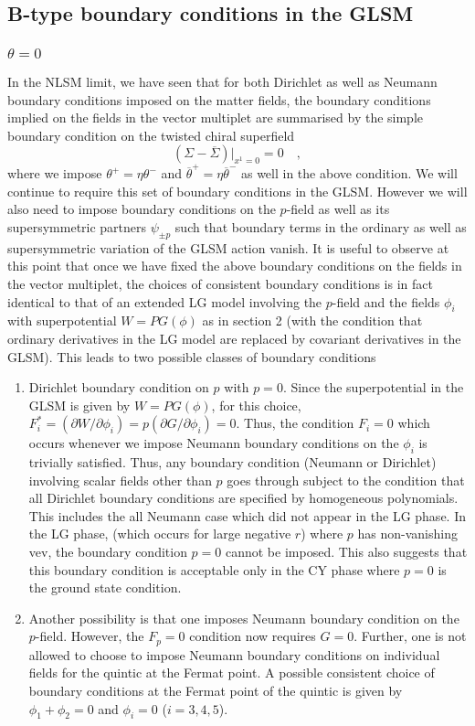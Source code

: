 \documentclass[a4paper,12pt]{article}
\begin{document}
\subsection{B-type boundary conditions in the GLSM}

\subsubsection{$\theta=0$}

In the NLSM limit, we have seen that for both Dirichlet as well as Neumann
boundary conditions imposed on the matter fields, the boundary
conditions implied on the fields in the vector multiplet are summarised
by the simple boundary condition on the twisted chiral superfield
\begin{equation}
(\Sigma - \overline{\Sigma})|_{x^1=0} =0\quad,
\end{equation}
where we impose $\theta^+=\eta\theta^-$ and
$\overline{\theta}^+=\eta\overline{\theta}^-$ as well in the above condition.
We will continue to require this set of boundary conditions in the
GLSM. However we will also need to impose boundary  conditions on
the $p$-field as well as its supersymmetric partners $\psi_{\pm p}$
such that boundary terms in the ordinary as well as supersymmetric
variation of the GLSM action vanish. 
It is useful to observe at this point that once we
have fixed the above boundary conditions on the fields in the vector
multiplet, the choices of consistent boundary conditions is in fact
identical to that of an extended LG model involving the $p$-field
and the fields $\phi_i$ with superpotential $W=PG(\phi)$
as in section 2 (with the condition that ordinary
derivatives in the LG model  are replaced by covariant derivatives
in the GLSM).  This leads to two possible classes of boundary conditions 
\begin{enumerate}
\item Dirichlet boundary condition on $p$ with $p=0$. Since the
superpotential in the GLSM is given by $W=PG(\phi)$, for this choice,
$F_i^*=(\partial W/\partial \phi_i)= p (\partial G/\partial \phi_i)=0$.
Thus, the condition $F_i=0$ which occurs whenever we impose Neumann
boundary conditions on the $\phi_i$ 
is trivially satisfied. Thus, any boundary
condition (Neumann or Dirichlet) involving 
scalar fields other than $p$ goes through subject to
the condition that all Dirichlet boundary conditions
are specified by homogeneous polynomials.
This includes the all Neumann case which did not
appear in the LG phase. In the LG phase,
(which occurs for large negative $r$) where $p$ has non-vanishing vev,
the boundary condition $p=0$ cannot be imposed. 
This also suggests that this boundary condition is acceptable 
only in the  CY phase where $p=0$ is the ground state condition.
\item Another possibility is that one imposes Neumann boundary
condition on the $p$-field. 
However, the $F_p=0$ condition now requires $G=0$.
Further, one is not allowed to choose to impose Neumann boundary
conditions on individual fields for the quintic at the Fermat point.
A possible consistent choice of boundary conditions at the Fermat point
of the quintic is given by $\phi_1 + \phi_2=0$
and $\phi_i=0$ ($i=3,4,5$). 
\end{enumerate}
\end{document}
